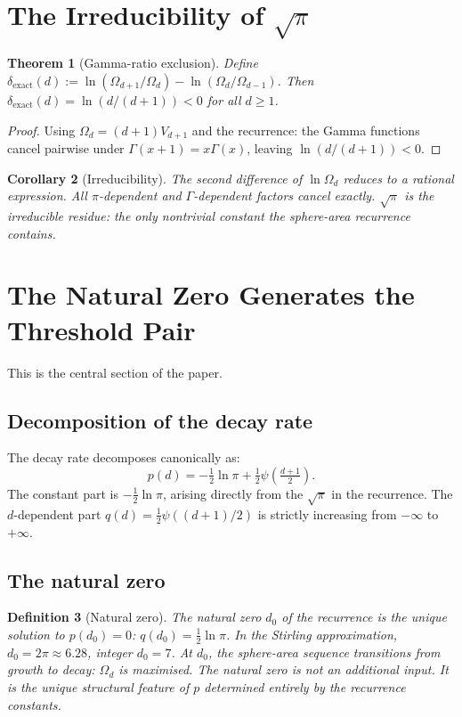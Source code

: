 \documentclass[11pt,a4paper]{article}
\newtheorem{theorem}{Theorem}[section]
\newtheorem{corollary}[theorem]{Corollary}
\newtheorem{definition}[theorem]{Definition}
\begin{document}
\section{The Irreducibility of $\sqrt{\pi}$}

\begin{theorem}[Gamma-ratio exclusion]
Define $\delta_{\mathrm{exact}}(d) := \ln(\Omega_{d+1}/\Omega_d) - \ln(\Omega_d/\Omega_{d-1})$. Then $\delta_{\mathrm{exact}}(d) = \ln(d/(d+1)) < 0$ for all $d\geq 1$.
\end{theorem}

\begin{proof}
Using $\Omega_d = (d+1)V_{d+1}$ and the recurrence: the Gamma functions cancel pairwise under $\Gamma(x+1) = x\Gamma(x)$, leaving $\ln(d/(d+1)) < 0$.
\end{proof}

\begin{corollary}[Irreducibility]
The second difference of $\ln\Omega_d$ reduces to a rational expression. All $\pi$-dependent and $\Gamma$-dependent factors cancel exactly. $\sqrt{\pi}$ is the irreducible residue: the only nontrivial constant the sphere-area recurrence contains.
\end{corollary}

\section{The Natural Zero Generates the Threshold Pair}

This is the central section of the paper.

\subsection{Decomposition of the decay rate}

The decay rate decomposes canonically as:
\[
p(d) = -\tfrac{1}{2}\ln\pi + \tfrac{1}{2}\psi\!\left(\tfrac{d+1}{2}\right).
\]
The constant part is $-\frac{1}{2}\ln\pi$, arising directly from the $\sqrt{\pi}$ in the recurrence. The $d$-dependent part $q(d) = \frac{1}{2}\psi((d+1)/2)$ is strictly increasing from $-\infty$ to $+\infty$.

\subsection{The natural zero}

\begin{definition}[Natural zero]
The natural zero $d_0$ of the recurrence is the unique solution to $p(d_0) = 0$: $q(d_0) = \frac{1}{2}\ln\pi$. In the Stirling approximation, $d_0 = 2\pi\approx 6.28$, integer $d_0 = 7$. At $d_0$, the sphere-area sequence transitions from growth to decay: $\Omega_d$ is maximised. The natural zero is not an additional input. It is the unique structural feature of $p$ determined entirely by the recurrence constants.
\end{definition}
\end{document}
